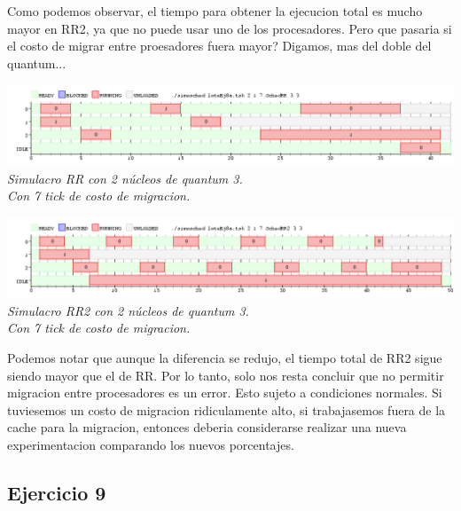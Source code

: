 Como podemos observar, el tiempo para obtener la ejecucion total es mucho mayor en RR2, ya que no puede usar uno de los procesadores. 
\textquestiondown Pero que pasaria si el costo de migrar entre proesadores fuera mayor? Digamos, mas del doble del quantum...

\vspace{\baselineskip}
\begin{center}
\includegraphics[scale=0.45]{../tp1/Test/resEj8Co2SBRRMM.png}
\\
\vspace{1pt}
\footnotesize\textit{Simulacro RR con 2 n\'ucleos de quantum 3.\\Con 7 tick de costo de migracion.}
\end{center}
\vspace{\baselineskip}

\vspace{\baselineskip}
\begin{center}
\includegraphics[scale=0.45]{../tp1/Test/resEj8Co2SBRR2MM.png}
\\
\vspace{1pt}
\footnotesize\textit{Simulacro RR2 con 2 n\'ucleos de quantum 3.\\Con 7 tick de costo de migracion.}
\end{center}
\vspace{\baselineskip}

Podemos notar que aunque la diferencia se redujo, el tiempo total de RR2 sigue siendo mayor que el de RR. Por lo tanto, solo nos resta concluir que 
no permitir migracion entre procesadores es un error. Esto sujeto a condiciones normales.  Si tuviesemos un costo de migracion ridiculamente alto, 
si trabajasemos fuera de la cache para la migracion, 
entonces deberia considerarse realizar una nueva experimentacion comparando los nuevos porcentajes.

\subsection{Ejercicio 9}


